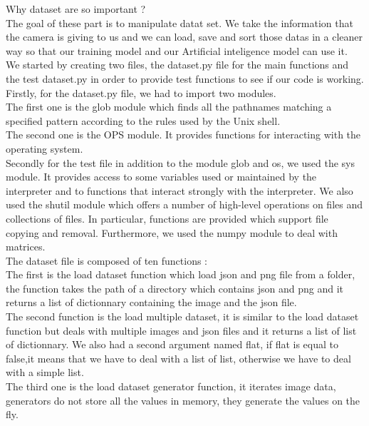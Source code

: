 \documentclass[12pt]{article}
\begin{document}
Why dataset are so important ? \\ 
The goal of these part is to manipulate datat set. We take the information that the camera is giving to us and we can load, save and sort those datas in a cleaner way so that our training model and our Artificial inteligence model can use it.\\

We started by creating two files, the dataset.py file for the main functions and the test dataset.py in order to provide test functions to see if our code is working.\\

Firstly, for the dataset.py file, we had to import  two modules. \\
The first one is the glob module which finds all the pathnames matching a specified pattern according to the rules used by the Unix shell.\\
The second one is the OPS module. It provides functions for interacting with the operating system.\\

Secondly for the test file in addition to the module glob and os, we used the sys module. It provides access to some variables used or maintained by the interpreter and to functions that interact strongly with the interpreter.
We also used the shutil module which offers a number of high-level operations on files and collections of files. In particular, functions are provided which support file copying and removal. Furthermore, we used the numpy module to deal with matrices.\\


The dataset file is composed of ten functions :\\ 

The first is the load dataset function which load json and png file from a folder, the function takes the path of a directory which contains json and png and it returns a list of dictionnary containing the image and the json file.\\

The second function is the load multiple dataset, it is similar to the load dataset function but deals with multiple images and json files and it returns a list of list of dictionnary.  We also had a second argument named flat, if flat is equal to false,it means that we have to deal with a list of list, otherwise we have to deal with a simple list.\\

The third one is the load dataset generator function, it iterates image data, generators do not store all the values in memory, they generate the values on the fly.\\
\end{document}
